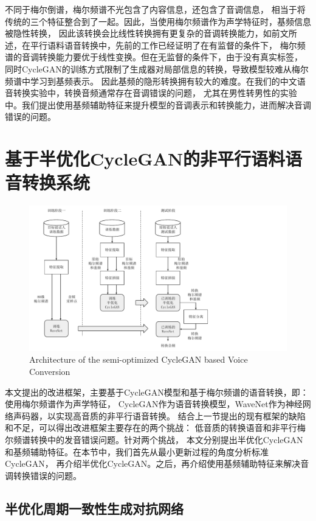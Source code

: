 不同于梅尔倒谱，梅尔频谱不光包含了内容信息，还包含了音调信息，
相当于将传统的三个特征整合到了一起。因此，当使用梅尔频谱作为声学特征时，基频信息被隐性转换，
因此该转换会比线性转换拥有更复杂的音调转换能力，如前文所述，在平行语料语音转换中，先前的工作已经证明了在有监督的条件下，
梅尔频谱的音调转换能力要优于线性变换。但在无监督的条件下，由于没有真实标签，
同时CycleGAN的训练方式限制了生成器对局部信息的转换，导致模型较难从梅尔频谱中学习到基频表示。
因此基频的隐形转换拥有较大的难度。在我们的中文语音转换实验中，转换音频通常存在音调错误的问题，
尤其在男性转男性的实验中。我们提出使用基频辅助特征来提升模型的音调表示和转换能力，进而解决音调错误的问题。

\section{基于半优化CycleGAN的非平行语料语音转换系统}

\begin{figure}[!htp]
    \centering
    \includegraphics[width=12cm,trim=0 10 200 0,clip]{figure/4_proposedarch.pdf}
    {Architecture of the semi-optimized CycleGAN based Voice Conversion}
    \label{fig:proposedarch}
\end{figure}

本文提出的改进框架，主要基于CycleGAN模型和基于梅尔频谱的语音转换，即：使用梅尔频谱作为声学特征，
CycleGAN作为语音转换模型，WaveNet作为神经网络声码器，以实现高音质的非平行语音转换。
结合上一节提出的现有框架的缺陷和不足，可以得出改进框架主要存在的两个挑战：
低音质的转换语音和非平行梅尔频谱转换中的发音错误问题。针对两个挑战，
本文分别提出半优化CycleGAN和基频辅助特征。在本节中，我们首先从最小更新过程的角度分析标准CycleGAN，
再介绍半优化CycleGAN。之后，再介绍使用基频辅助特征来解决音调转换错误的问题。

\subsection{半优化周期一致性生成对抗网络}

